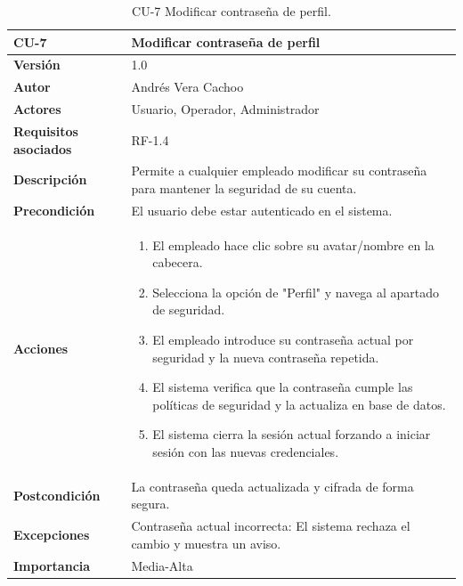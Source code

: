 \begin{table}[H]
	\centering
	\begin{tabularx}{\linewidth}{ p{} p{} }
		\toprule
		\textbf{CU-7}    & \textbf{Modificar contraseña de perfil}\\
		\toprule
		\textbf{Versión}              & 1.0    \\
		\textbf{Autor}                & Andrés Vera Cachoo \\
		\textbf{Actores}              & Usuario, Operador, Administrador \\
		\textbf{Requisitos asociados} & RF-1.4 \\
		\textbf{Descripción}          & Permite a cualquier empleado modificar su contraseña para mantener la seguridad de su cuenta. \\
		\textbf{Precondición}         & El usuario debe estar autenticado en el sistema. \\
		\textbf{Acciones}             &
		\begin{enumerate}
			\def\labelenumi{\arabic{enumi}.}
			\tightlist
			\item El empleado hace clic sobre su avatar/nombre en la cabecera.
			\item Selecciona la opción de "Perfil" y navega al apartado de seguridad.
			\item El empleado introduce su contraseña actual por seguridad y la nueva contraseña repetida.
            \item El sistema verifica que la contraseña cumple las políticas de seguridad y la actualiza en base de datos.
            \item El sistema cierra la sesión actual forzando a iniciar sesión con las nuevas credenciales.
		\end{enumerate}\\
		\textbf{Postcondición}        & La contraseña queda actualizada y cifrada de forma segura. \\
		\textbf{Excepciones}          & Contraseña actual incorrecta: El sistema rechaza el cambio y muestra un aviso. \\
		\textbf{Importancia}          & Media-Alta \\
		\bottomrule
	\end{tabularx}
	\caption{CU-7 Modificar contraseña de perfil.}
\end{table}

